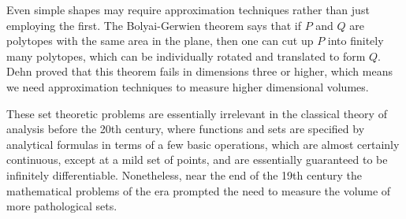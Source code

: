 \begin{remark}
Even simple shapes may require approximation techniques rather than just employing the first. The Bolyai-Gerwien theorem says that if $P$ and $Q$ are polytopes with the same area in the plane, then one can cut up $P$ into finitely many polytopes, which can be individually rotated and translated to form $Q$. Dehn proved that this theorem fails in dimensions three or higher, which means we need approximation techniques to measure higher dimensional volumes.
\end{remark}

These set theoretic problems are essentially irrelevant in the classical theory of analysis before the 20th century, where functions and sets are specified by analytical formulas in terms of a few basic operations, which are almost certainly continuous, except at a mild set of points, and are essentially guaranteed to be infinitely differentiable. Nonetheless, near the end of the 19th century the mathematical problems of the era prompted the need to measure the volume of more pathological sets.
%
